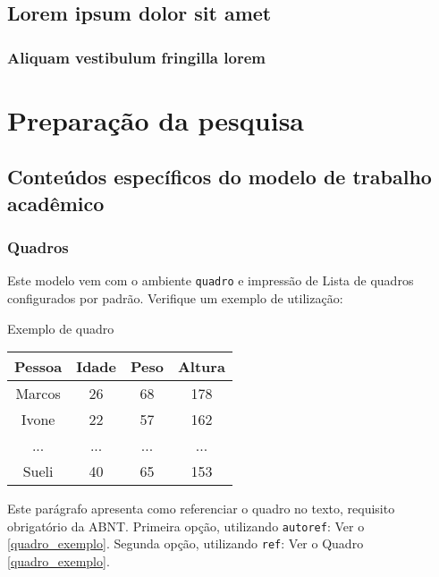 \documentclass[12pt,]{04-class-files/abntex2}
\begin{document}
\chapter{Lorem ipsum dolor sit amet}

\section{Aliquam vestibulum fringilla lorem}

\lipsum[1]

\lipsum[2-3]

\part{Preparação da pesquisa}



\chapter{Conteúdos específicos do modelo de trabalho acadêmico}\label{cap_trabalho_academico}

\section{Quadros}

Este modelo vem com o ambiente \texttt{quadro} e impressão de Lista de quadros
configurados por padrão. Verifique um exemplo de utilização:

\begin{quadro}[htb]
\caption{\label{quadro_exemplo}Exemplo de quadro}
\begin{tabular}{|c|c|c|c|}
	\hline
	\textbf{Pessoa} & \textbf{Idade} & \textbf{Peso} & \textbf{Altura} \\ \hline
	Marcos & 26    & 68   & 178    \\ \hline
	Ivone  & 22    & 57   & 162    \\ \hline
	...    & ...   & ...  & ...    \\ \hline
	Sueli  & 40    & 65   & 153    \\ \hline
\end{tabular}
\end{quadro}

Este parágrafo apresenta como referenciar o quadro no texto, requisito
obrigatório da ABNT.
Primeira opção, utilizando \texttt{autoref}: Ver o \autoref{quadro_exemplo}.
Segunda opção, utilizando \texttt{ref}: Ver o Quadro \ref{quadro_exemplo}.
\end{document}
